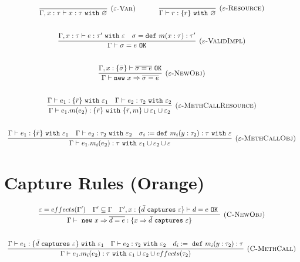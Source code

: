 \documentclass{article}
\newcommand{\keywadj}[1]{\mathtt{#1}}
\newcommand{\keyw}[1]{\keywadj{#1}~}
\begin{document}
\[
\begin{array}{c}
\infer[\textsc{($\varepsilon$-Var)}]
  {\Gamma, x:\tau \vdash x:\tau~ \keyw{with} \varnothing}
  {} 
~~~~~~~~~~
\infer[\textsc{($\varepsilon$-Resource)}]
  {\Gamma \vdash r:\{ r \} ~ \keyw{with} \varnothing}
  {} \\[5ex]

\infer[\textsc{($\varepsilon$-ValidImpl)}]
	{\Gamma \vdash \sigma = e~\keywadj{OK}}
	{\Gamma, x:\tau \vdash e: \tau'~\keyw{with} \varepsilon & \sigma = \keyw{def} m(x:\tau):\tau'} \\[5ex]

\infer[\textsc{($\varepsilon$-NewObj)}]
	{\Gamma \vdash \keywadj{new}~x \Rightarrow \overline{\sigma = e}}
	{\Gamma, x : \{ \bar \sigma \} \vdash \overline{\sigma = e}~\keywadj{OK}} \\[5ex]

\infer[\textsc{($\varepsilon$-MethCallResource)}]
	{\Gamma \vdash e_1.m(e_2) : \{ \bar r \}~\keyw{with} \{ \bar r, m\} \cup \varepsilon_1 \cup \varepsilon_2}
	{\Gamma \vdash e_1 : \{ \bar r \}~ \keyw{with} \varepsilon_1 & \Gamma \vdash e_2:\tau_2~\keyw{with} \varepsilon_2} \\[5ex]
	
\infer[\textsc{($\varepsilon$-MethCallObj)}]
	{\Gamma \vdash e_1.m_i(e_2):\tau~\keyw{with} \varepsilon_1 \cup \varepsilon_2 \cup \varepsilon}
	{\Gamma \vdash e_1 : \{ \bar r \}~\keyw{with} \varepsilon_1 & \Gamma \vdash e_2 : \tau_2~\keyw{with} \varepsilon_2 & \sigma_i := \keyw{def} m_i(y:\tau_2):\tau~\keyw{with} \varepsilon}

\end{array}
\]

\section{Capture Rules (Orange)}

\[
\begin{array}{c}

\infer[\textsc{(C-NewObj)}]
	{\Gamma \vdash~\keywadj{new}~x \Rightarrow \overline{ d = e} : \{ x \Rightarrow \bar d~\keyw{captures} \varepsilon \} }
	{\varepsilon = effects(\Gamma') & \Gamma' \subseteq \Gamma & \Gamma', x : \{ \bar d~\keyw {captures} \varepsilon \} \vdash d = e~\keyw{OK}} \\[5ex]

\infer[\textsc{(C-MethCall)}]
	{\Gamma \vdash e_1.m_i(e_2) : \tau~ \keyw{with} \varepsilon_1 \cup \varepsilon_2 \cup effects(\tau_2)}
	{\Gamma \vdash e_1 : \{ \bar d~\keyw{captures} \varepsilon \}~\keyw{with} \varepsilon_1 & \Gamma \vdash e_2:\tau_2~\keyw{with} \varepsilon_2&d_i :=~\keyw{def} m_i(y:\tau_2):\tau }


\end{array}
\]
\end{document}
